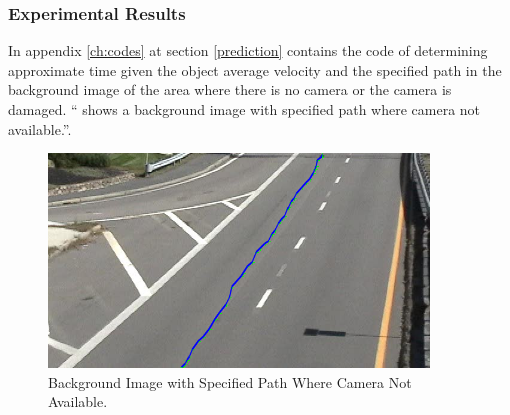 \subsubsection{Experimental Results}
In appendix \ref{ch:codes} at section \ref{prediction} contains the code of determining approximate time given the object average velocity and the specified path in the background image of the area where there is no camera or the camera is damaged. `` shows a background image with specified path where camera not available.''.

\begin{figure}[H]
  \centering
  \includegraphics[width=0.9\textwidth]{figures/background}
  \caption{Background Image with Specified Path Where Camera Not Available.}
  \label{fig:background}
\end{figure} 

\endinput

